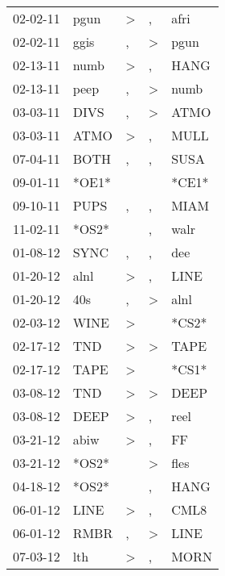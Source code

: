 \begin{supertabular}{lllll}
 02-02-11 &   pgun &     \textgreater &                , &   afri \\
 02-02-11 &   ggis &                , &     \textgreater &   pgun \\
 02-13-11 &   numb &     \textgreater &                , &   HANG \\
 02-13-11 &   peep &                , &     \textgreater &   numb \\
 03-03-11 &   DIVS &                , &     \textgreater &   ATMO \\
 03-03-11 &   ATMO &     \textgreater &                , &   MULL \\
 07-04-11 &   BOTH &                , &                , &   SUSA \\
 09-01-11 &  *OE1* &                  &                  &  *CE1* \\
 09-10-11 &   PUPS &                , &                , &   MIAM \\
 11-02-11 &  *OS2* &                  &                , &   walr \\
 01-08-12 &   SYNC &                , &                , &    dee \\
 01-20-12 &   alnl &     \textgreater &                , &   LINE \\
 01-20-12 &    40s &                , &     \textgreater &   alnl \\
 02-03-12 &   WINE &     \textgreater &                  &  *CS2* \\
 02-17-12 &    TND &     \textgreater &     \textgreater &   TAPE \\
 02-17-12 &   TAPE &     \textgreater &                  &  *CS1* \\
 03-08-12 &    TND &     \textgreater &     \textgreater &   DEEP \\
 03-08-12 &   DEEP &     \textgreater &                , &   reel \\
 03-21-12 &   abiw &     \textgreater &                , &     FF \\
 03-21-12 &  *OS2* &                  &     \textgreater &   fles \\
 04-18-12 &  *OS2* &                  &                , &   HANG \\
 06-01-12 &   LINE &     \textgreater &                , &   CML8 \\
 06-01-12 &   RMBR &                , &     \textgreater &   LINE \\
 07-03-12 &    lth &     \textgreater &                , &   MORN \\

\end{supertabular}
